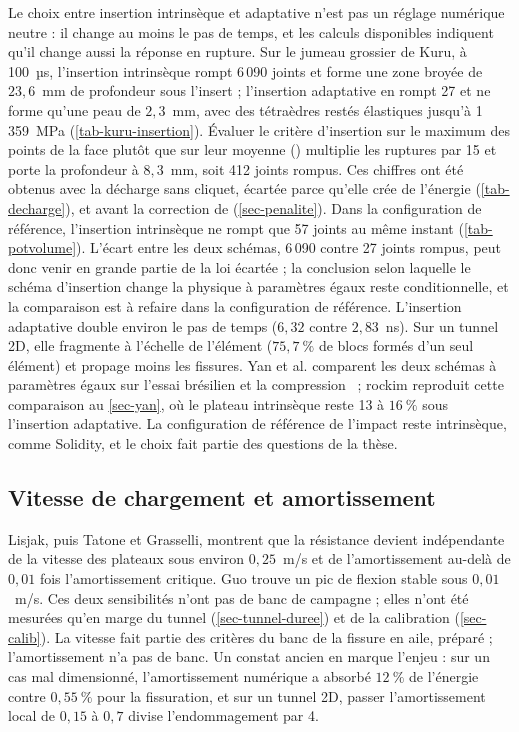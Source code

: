 Le choix entre insertion intrinsèque et adaptative n'est pas un réglage numérique neutre : il change au moins le pas de temps, et les calculs disponibles indiquent qu'il change aussi la réponse en rupture. Sur le jumeau grossier de Kuru, à 100~µs, l'insertion intrinsèque rompt 6\,090 joints et forme une zone broyée de $23{,}6$~mm de profondeur sous l'insert ; l'insertion adaptative en rompt 27 et ne forme qu'une peau de $2{,}3$~mm, avec des tétraèdres restés élastiques jusqu'à 1\,359~MPa (\cref{tab-kuru-insertion}). Évaluer le critère d'insertion sur le maximum des points de la face plutôt que sur leur moyenne () multiplie les ruptures par 15 et porte la profondeur à $8{,}3$~mm, soit 412 joints rompus. Ces chiffres ont été obtenus avec la décharge  sans cliquet, écartée parce qu'elle crée de l'énergie (\cref{tab-decharge}), et avant la correction de  (\cref{sec-penalite}). Dans la configuration de référence, l'insertion intrinsèque ne rompt que 57 joints au même instant (\cref{tab-potvolume}). L'écart entre les deux schémas, 6\,090 contre 27 joints rompus, peut donc venir en grande partie de la loi écartée ; la conclusion selon laquelle le schéma d'insertion change la physique à paramètres égaux reste conditionnelle, et la comparaison est à refaire dans la configuration de référence. L'insertion adaptative double environ le pas de temps ($6{,}32$ contre $2{,}83$~ns). Sur un tunnel 2D, elle fragmente à l'échelle de l'élément ($75{,}7~\%$ de blocs formés d'un seul élément) et propage moins les fissures. Yan et al. comparent les deux schémas à paramètres égaux sur l'essai brésilien et la compression~\cite{yan2023adaptive} ; rockim reproduit cette comparaison au \cref{sec-yan}, où le plateau intrinsèque reste 13 à $16~\%$ sous l'insertion adaptative. La configuration de référence de l'impact reste intrinsèque, comme Solidity, et le choix fait partie des questions de la thèse.

\subsection{Vitesse de chargement et amortissement}

Lisjak, puis Tatone et Grasselli, montrent que la résistance devient indépendante de la vitesse des plateaux sous environ $0{,}25$~m/s et de l'amortissement au-delà de $0{,}01$ fois l'amortissement critique. Guo trouve un pic de flexion stable sous $0{,}01$~m/s. Ces deux sensibilités n'ont pas de banc de campagne ; elles n'ont été mesurées qu'en marge du tunnel (\cref{sec-tunnel-duree}) et de la calibration (\cref{sec-calib}). La vitesse fait partie des critères du banc de la fissure en aile, préparé ; l'amortissement n'a pas de banc. Un constat ancien en marque l'enjeu : sur un cas mal dimensionné, l'amortissement numérique a absorbé $12~\%$ de l'énergie contre $0{,}55~\%$ pour la fissuration, et sur un tunnel 2D, passer l'amortissement local de $0{,}15$ à $0{,}7$ divise l'endommagement par 4.
